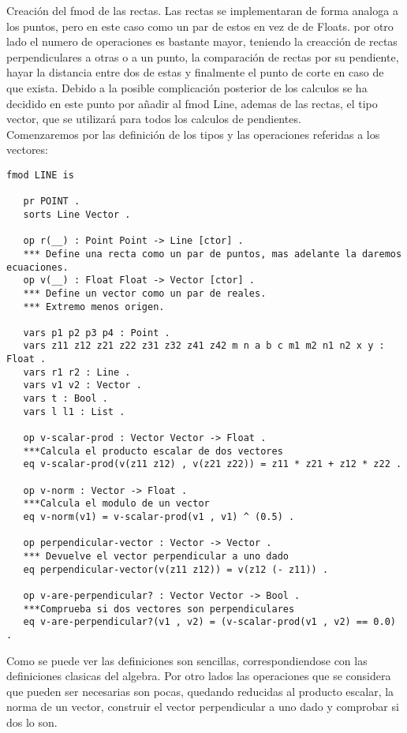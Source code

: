 Creaci\'on del fmod de las rectas. Las rectas se implementaran de forma analoga a los puntos, pero en este caso como un par de estos en vez de de Floats. por otro lado el numero de operaciones es bastante mayor, teniendo la creacci\'on de rectas perpendiculares a otras o a un punto, la comparaci\'on de rectas por su pendiente, hayar la distancia entre dos de estas y finalmente el punto de corte en caso de que exista. Debido a la posible complicaci\'on posterior de los calculos se ha decidido en este punto por añadir al fmod Line, ademas de las rectas, el tipo vector, que se utilizar\'a para todos los calculos de pendientes. \\

Comenzaremos por las definici\'on de los tipos y las operaciones referidas a los vectores: \par

\begin{verbatim}
fmod LINE is 

   pr POINT .
   sorts Line Vector .

   op r(__) : Point Point -> Line [ctor] .
   *** Define una recta como un par de puntos, mas adelante la daremos ecuaciones.
   op v(__) : Float Float -> Vector [ctor] .
   *** Define un vector como un par de reales.
   *** Extremo menos origen.

   vars p1 p2 p3 p4 : Point .
   vars z11 z12 z21 z22 z31 z32 z41 z42 m n a b c m1 m2 n1 n2 x y : Float .
   vars r1 r2 : Line .
   vars v1 v2 : Vector .
   vars t : Bool .
   vars l l1 : List .

   op v-scalar-prod : Vector Vector -> Float .
   ***Calcula el producto escalar de dos vectores
   eq v-scalar-prod(v(z11 z12) , v(z21 z22)) = z11 * z21 + z12 * z22 .

   op v-norm : Vector -> Float .
   ***Calcula el modulo de un vector
   eq v-norm(v1) = v-scalar-prod(v1 , v1) ^ (0.5) .

   op perpendicular-vector : Vector -> Vector .
   *** Devuelve el vector perpendicular a uno dado
   eq perpendicular-vector(v(z11 z12)) = v(z12 (- z11)) .

   op v-are-perpendicular? : Vector Vector -> Bool .
   ***Comprueba si dos vectores son perpendiculares
   eq v-are-perpendicular?(v1 , v2) = (v-scalar-prod(v1 , v2) == 0.0) .

\end{verbatim}

Como se puede ver las definiciones son sencillas, correspondiendose con las definiciones clasicas del algebra. 
Por otro lados las operaciones que se considera que pueden ser necesarias son pocas, quedando reducidas al producto escalar, la norma de un vector, construir el vector perpendicular a uno dado y comprobar si dos lo son. \\

